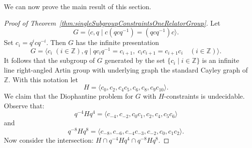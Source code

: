 \documentclass[11pt]{amsart}
\theoremstyle{definition}
\numberwithin{theorem}{section}
\newcommand{\Z}{\mathbb{Z}}
\begin{document}
We can now prove the main result of this section.

\begin{proof}[Proof of Theorem~\ref{thm:singleSubgroupConstraintsOneRelatorGroup}]
Let
\[
G = \langle c, q \mid c(qcq^{-1}) = (qcq^{-1})c \rangle.
\] 
Set 
$c_i = q^i c q^{-i}$. 
Then $G$ has the infinite presentation  
\[
G = \langle c_i \; (i \in \mathbb{Z}), q \mid 
qc_iq^{-1} = c_{i+1}, \;  
c_i c_{i+1} = c_{i+1} c_i \quad (i \in \mathbb{Z})
\rangle.
\]   
It follows that  
the subgroup of $G$ generated
by the set $\{c_i \mid i \in \Z\}$ is an infinite line right-angled Artin group with underlying
graph the standard Cayley graph of $\mathbb{Z}$. With this notation let 
\[
H = 
\langle 
c_0, c_2, 
c_4c_5, c_6, 
c_8, c_9c_{10}
\rangle. 
\] 
We claim that the Diophantine problem for $G$ with $H$-constraints 
is undecidable.  
Observe that:
\[
q^{-4}Hq^4 = 
\langle 
c_{-4}, c_{-2}, 
c_0c_1, c_2, 
c_4, c_5c_{6}
\rangle 
\] 
and 
\[
q^{-8}Hq^8 = 
\langle 
c_{-8}, c_{-6}, 
c_{-4}c_{-3}, c_{-2}, 
c_0, c_1c_{2}
\rangle. 
\] 
Now consider the intersection: \( H \cap q^{-4}Hq^4 \cap q^{-8}Hq^8\).


\end{proof}
\end{document}
